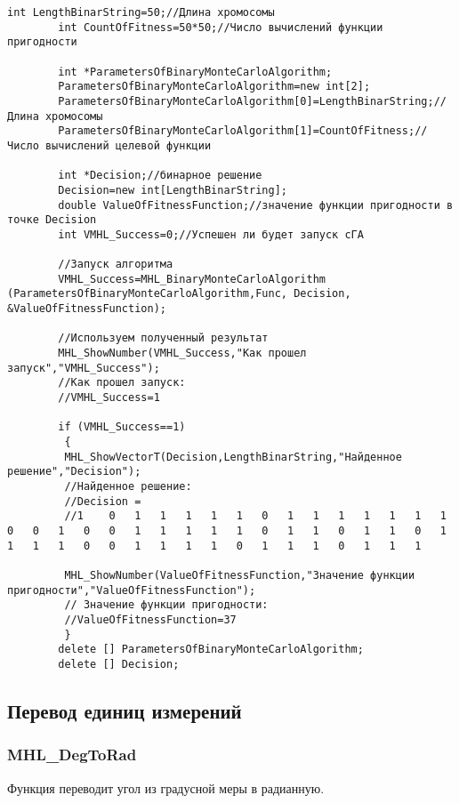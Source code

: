 \documentclass[a4paper,12pt]{article}
\begin{document}
\begin{lstlisting}[label=code_use_MHL_BinaryMonteCarloAlgorithm,caption=Пример использования]
        int LengthBinarString=50;//Длина хромосомы
        int CountOfFitness=50*50;//Число вычислений функции пригодности

        int *ParametersOfBinaryMonteCarloAlgorithm;
        ParametersOfBinaryMonteCarloAlgorithm=new int[2];
        ParametersOfBinaryMonteCarloAlgorithm[0]=LengthBinarString;//Длина хромосомы
        ParametersOfBinaryMonteCarloAlgorithm[1]=CountOfFitness;//Число вычислений целевой функции

        int *Decision;//бинарное решение
        Decision=new int[LengthBinarString];
        double ValueOfFitnessFunction;//значение функции пригодности в точке Decision
        int VMHL_Success=0;//Успешен ли будет запуск cГА

        //Запуск алгоритма
        VMHL_Success=MHL_BinaryMonteCarloAlgorithm (ParametersOfBinaryMonteCarloAlgorithm,Func, Decision, &ValueOfFitnessFunction);

        //Используем полученный результат
        MHL_ShowNumber(VMHL_Success,"Как прошел запуск","VMHL_Success");
        //Как прошел запуск:
        //VMHL_Success=1

        if (VMHL_Success==1)
         {
         MHL_ShowVectorT(Decision,LengthBinarString,"Найденное решение","Decision");
         //Найденное решение:
         //Decision =
         //1	0	1	1	1	1	1	0	1	1	1	1	1	1	1	0	0	1	0	0	1	1	1	1	1	0	1	1	0	1	1	0	1	1	1	1	0	0	1	1	1	1	0	1	1	1	0	1	1	1

         MHL_ShowNumber(ValueOfFitnessFunction,"Значение функции пригодности","ValueOfFitnessFunction");
         // Значение функции пригодности:
         //ValueOfFitnessFunction=37
         }
        delete [] ParametersOfBinaryMonteCarloAlgorithm;
        delete [] Decision;
\end{lstlisting}

\subsection{Перевод единиц измерений}

\subsubsection{MHL\_DegToRad}\label{MHL_DegToRad}

Функция переводит угол из градусной меры в радианную.
\end{document}
